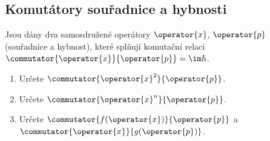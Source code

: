 \subsection{Komutátory souřadnice a hybnosti}\label{sec:CommutatorXP}
Jsou dány dva samosdružené operátory $\operator{x}$, $\operator{p}$ (souřadnice a hybnost), které splňují komutační relaci $\commutator{\operator{x}}{\operator{p}}=\im\hbar$.

\begin{enumerate}
\item
    Určete $\commutator{\operator{x}^{2}}{\operator{p}}$.
\item
    Určete $\commutator{\operator{x}^{n}}{\operator{p}}$.
\item
    Určete $\commutator{f(\operator{x})}{\operator{p}}$ a $\commutator{\operator{x}}{g(\operator{p})}$.
\end{enumerate}

